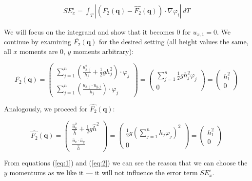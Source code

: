 \documentclass{article}
\renewcommand{\phi}{\varphi}
\begin{document}
\begin{align*}
  SE_x^i = \int_T \left| \left(\overline{F_2}(\mathbf{q}) - \widehat{F_2}(\mathbf{q})\right) \cdot \nabla \phi_i \right|\, dT
\end{align*}

We will focus on the integrand and show that it becomes 0 for $u_{x,1}=0$. We continue by examining $\overline{F_2}(\mathbf{q})$ for the desired setting (all height values the same, all $x$ moments are 0, $y$ moments arbitrary):

\begin{equation}
  \label{eq:1}
  \overline{F_2}(\mathbf{q}) =
  \begin{pmatrix}
    \sum_{j=1}^n \left( \frac{u_{x,j}^2}{h_j} + \frac{1}{2} g h_j^2 \right) \cdot \phi_j \\
    \sum_{j=1}^n \left( \frac{u_{x,j}\cdot u_{y,j}}{h_j} \right) \cdot \phi_j
  \end{pmatrix} =
  \begin{pmatrix}
    \sum_{j=1}^n \frac{1}{2} g h_j^2 \phi_j \\
    0
  \end{pmatrix} =
  \begin{pmatrix}
    h_1^2 \\ 0
  \end{pmatrix}
\end{equation}

Analogously, we proceed for $\widehat{F_2}(\mathbf{q})$:

\begin{equation}
  \label{eq:2}
  \widehat{F_2}(\mathbf{q}) =
  \begin{pmatrix}
    \frac{\widehat{u}_x^2}{\widehat h} + \frac{1}{2} g \widehat h ^2 \\
    \frac{\widehat u_x \cdot \widehat u_y}{\widehat h}
  \end{pmatrix} =
  \begin{pmatrix}
    \frac{1}{2} g \left( \sum_{j=1}^n h_j \phi_j \right) ^2 \\
    0
  \end{pmatrix} =
  \begin{pmatrix}
    h_1^2 \\ 0
  \end{pmatrix}
\end{equation}

From equations (\ref{eq:1}) and (\ref{eq:2}) we can see the reason that we can choose the $y$ momentums as we like it --- it will not influence the error term $SE_x^i$.
\end{document}
